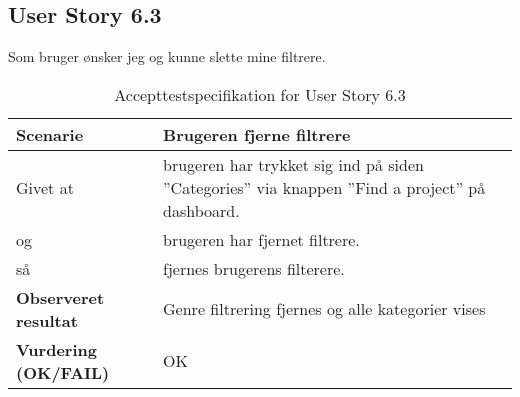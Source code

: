\subsection{User Story 6.3}
Som bruger ønsker jeg og kunne slette mine filtrere. 

\begin{table}[H]
	\centering
	\caption{Accepttestspecifikation for User Story 6.3 }
	\begin{tabular}{p{6cm}|p{6cm}}
		\hline
		\textbf{Scenarie} & Brugeren fjerne filtrere\\[10px]
		\hline
        Givet at & brugeren har trykket sig ind på siden ''Categories'' via knappen ''Find a project'' på dashboard.\\
        \hline
        og & brugeren har fjernet filtrere.\\
        \hline
        så & fjernes brugerens filterere.\\
		\hline
		\rowcolor{white}
		\textbf{Observeret resultat} & Genre filtrering fjernes og alle kategorier vises\\
		\hline
		\textbf{Vurdering (OK/FAIL)} & OK\\
		\hline
	\end{tabular}
\end{table}